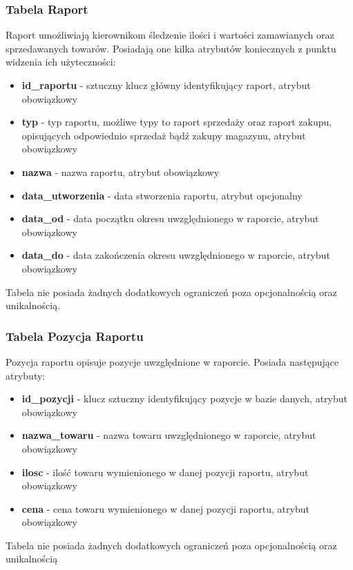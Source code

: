 \subsubsection{Tabela Raport}
Raport umożliwiają kierownikom śledzenie ilości i wartości zamawianych oraz
sprzedawanych towarów. Posiadają one kilka atrybutów koniecznych z punktu
widzenia ich użyteczności:
\begin{itemize}
  \item \textbf{id\_raportu} - sztuczny klucz główny identyfikujący raport,
  atrybut obowiązkowy
  \item \textbf{typ} - typ raportu, możliwe typy to raport sprzedaży oraz raport
  zakupu, opisujących odpowiednio sprzedaż bądź zakupy magazynu, atrybut
  obowiązkowy
  \item \textbf{nazwa} - nazwa raportu, atrybut obowiązkowy
  \item \textbf{data\_utworzenia} - data stworzenia raportu, atrybut opcjonalny
  \item \textbf{data\_od} - data początku okresu uwzględnionego w raporcie,
  atrybut obowiązkowy
  \item \textbf{data\_do} - data zakończenia okresu uwzględnionego w raporcie,
  atrybut obowiązkowy
\end{itemize}

Tabela nie posiada żadnych dodatkowych ograniczeń poza opcjonalnością oraz
unikalnością.

\subsubsection{Tabela Pozycja Raportu}
Pozycja raportu opisuje pozycje uwzględnione w raporcie. Posiada następujące atrybuty:
\begin{itemize}
  \item \textbf{id\_pozycji} - klucz sztuczny identyfikujący pozycje w bazie
  danych, atrybut obowiązkowy
  \item \textbf{nazwa\_towaru} - nazwa towaru uwzględnionego w raporcie, atrybut
  obowiązkowy
  \item \textbf{ilosc} - ilość towaru wymienionego w danej pozycji raportu,
  atrybut obowiązkowy
  \item \textbf{cena} - cena towaru wymienionego w danej pozycji raportu,
  atrybut obowiązkowy
\end{itemize}

Tabela nie posiada żadnych dodatkowych ograniczeń poza opcjonalnością oraz
unikalnością

